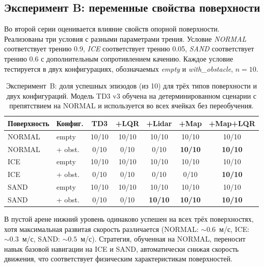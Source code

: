 \documentclass[11pt]{article}
\begin{document}
\subsection{Эксперимент B: переменные свойства поверхности}
\label{sec:exp_b}

Во второй серии оценивается влияние свойств опорной поверхности.
Реализованы три условия с разными параметрами трения. Условие \emph{NORMAL} соответствует трению 0.9, \emph{ICE} соответствует трению 0.05, \emph{SAND} соответствует трению 0.6 с дополнительным сопротивлением качению. Каждое условие тестируется в двух конфигурациях, обозначаемых \emph{empty} и \emph{with\_obstacle}, $n = 10$.

\begin{table}[h]
\begin{center}
\begin{tabular}{llccccc}
\toprule
Поверхность & Конфиг. & TD3 & +LQR & +Lidar & +Map & +Map+LQR \\
\midrule
NORMAL & empty     & 10/10 & 10/10 & 10/10 & 10/10 & 10/10 \\
NORMAL & + obst.   & 0/10  & 0/10  & 0/10  & \textbf{10/10} & \textbf{10/10} \\
ICE    & empty     & 10/10 & 10/10 & 10/10 & 10/10 & 10/10 \\
ICE    & + obst.   & 0/10  & 0/10  & 0/10  & 0/10  & \textbf{10/10} \\
SAND   & empty     & 10/10 & 10/10 & 10/10 & 10/10 & 10/10 \\
SAND   & + obst.   & 0/10  & 0/10  & \textbf{10/10}  & \textbf{10/10} & \textbf{10/10} \\
\bottomrule
\end{tabular}
\caption{Эксперимент~B: доля успешных эпизодов (из 10) для трёх типов
поверхности и двух конфигураций. Модель TD3 v3 обучена на детерминированном
сценарии с препятствием на NORMAL и используется во всех ячейках без
переобучения.}
\label{tab:exp_b}
\end{center}
\end{table}

В пустой арене нижний уровень одинаково успешен на всех трёх
поверхностях, хотя максимальная развитая скорость различается
(NORMAL: $\sim 0.6$~м/с, ICE: $\sim 0.3$~м/с, SAND: $\sim 0.5$~м/с).
Стратегия, обученная на NORMAL, переносит навык базовой навигации
на ICE и SAND, автоматически снижая скорость движения, что
соответствует физическим характеристикам поверхностей.
\end{document}
